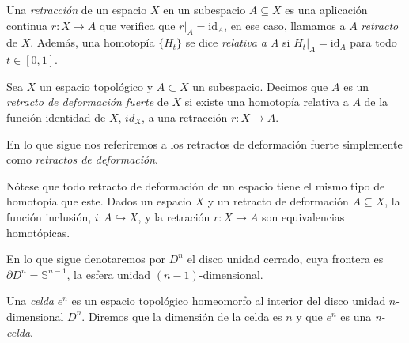 \bigskip

Una \textit{retracción} de un espacio $X$ en un subespacio $A\subseteq X$ es una aplicación continua $r:X\to A$ que verifica que $r|_A= \text{id}_A$, en ese caso, llamamos a $A$ \textit{retracto} de $X$. Además, una homotopía $\{H_t\}$ se dice \textit{relativa a A} si $H_t|_A=\text{id}_A$ para todo $t\in[0,1]$.

\begin{definition}
Sea $X$ un espacio topológico y $A \subset X$ un subespacio. Decimos que $A$ es un
\textit{retracto de deformación fuerte} de $X$ si existe una homotopía relativa a $A$ de la función identidad de $X$, $id_X$, a una retracción $r: X \to A$.
\end{definition}

\begin{nota}
    En lo que sigue nos referiremos a los retractos de deformación fuerte simplemente como \textit{retractos de deformación}.
\end{nota}

\begin{remark}
    Nótese que todo retracto de deformación de un espacio tiene el mismo tipo de homotopía que este. Dados un espacio $X$ y un retracto de deformación $A\subseteq X$, la función inclusión, $i: A\hookrightarrow X$, y la retración $r: X \to A$ son equivalencias homotópicas.
\end{remark}

\bigskip

En lo que sigue denotaremos por $D^n$ el disco unidad cerrado, cuya frontera es $\partial D^n=\mathbb{S}^{n-1}$, la esfera unidad $(n-1)$-dimensional.

\begin{definition}
    Una \textit{celda} $e^n$ es un espacio topológico homeomorfo al interior del disco unidad $n$-dimensional $D^n$. Diremos que la dimensión de la celda es $n$ y que $e^n$ es una \textit{n-celda}.
\end{definition}

\bigskip

